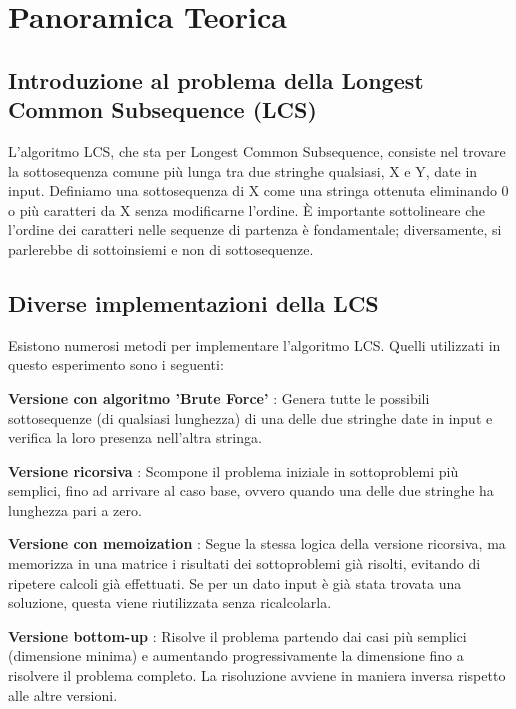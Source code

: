 \section{Panoramica Teorica}

	\subsection{Introduzione al problema della Longest Common Subsequence (LCS)}
L'algoritmo LCS, che sta per Longest Common Subsequence, consiste nel trovare la sottosequenza comune più lunga tra due stringhe qualsiasi, X e Y, date in input. Definiamo una sottosequenza di X come una stringa ottenuta eliminando 0 o più caratteri da X senza modificarne l'ordine. È importante sottolineare che l'ordine dei caratteri nelle sequenze di partenza è fondamentale; diversamente, si parlerebbe di sottoinsiemi e non di sottosequenze.
	
	\subsection{Diverse implementazioni della LCS}
Esistono numerosi metodi per implementare l'algoritmo LCS. Quelli utilizzati in questo esperimento sono i seguenti:
		
		\begin{DESC}{1}
			\item[\textbf{Versione con algoritmo 'Brute Force'}]: Genera tutte le possibili sottosequenze (di qualsiasi lunghezza) di una delle due stringhe date in input e verifica la loro presenza nell'altra stringa.
			\item[\textbf{Versione ricorsiva}]: Scompone il problema iniziale in sottoproblemi più semplici, fino ad arrivare al caso base, ovvero quando una delle due stringhe ha lunghezza pari a zero.
			\item[\textbf{Versione con memoization}]: Segue la stessa logica della versione ricorsiva, ma memorizza in una matrice i risultati dei sottoproblemi già risolti, evitando di ripetere calcoli già effettuati. Se per un dato input è già stata trovata una soluzione, questa viene riutilizzata senza ricalcolarla.
			\item[\textbf{Versione bottom-up}]: Risolve il problema partendo dai casi più semplici (dimensione minima) e aumentando progressivamente la dimensione fino a risolvere il problema completo. La risoluzione avviene in maniera inversa rispetto alle altre versioni.
		\end{DESC}
	
